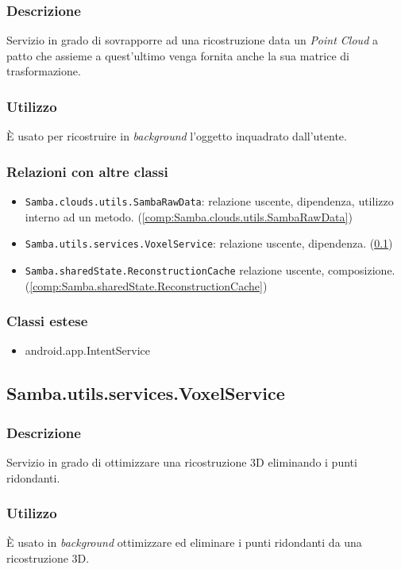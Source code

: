 \subsubsection{Descrizione}
Servizio in grado di sovrapporre ad una ricostruzione data un \emph{Point Cloud} a patto che assieme a quest'ultimo venga fornita anche la sua matrice di trasformazione.
\subsubsection{Utilizzo}
È usato per ricostruire in \emph{background} l'oggetto inquadrato dall'utente.
\subsubsection{Relazioni con altre classi}
\begin{itemize}
	\item \texttt{Samba.clouds.utils.SambaRawData}: relazione uscente, dipendenza, utilizzo interno ad un metodo. (\ref{comp:Samba.clouds.utils.SambaRawData})
	\item \texttt{Samba.utils.services.VoxelService}: relazione uscente, dipendenza. (\ref{comp:Samba.utils.services.VoxelService})
	\item \texttt{Samba.sharedState.ReconstructionCache} relazione uscente, composizione. (\ref{comp:Samba.sharedState.ReconstructionCache})
\end{itemize}
\subsubsection{Classi estese}
\begin{itemize}
	\item android.app.IntentService
\end{itemize}

\subsection{Samba.utils.services.VoxelService}\label{comp:Samba.utils.services.VoxelService}
\subsubsection{Descrizione}
Servizio in grado di ottimizzare una ricostruzione 3D eliminando i punti ridondanti.
\subsubsection{Utilizzo}
È usato in \emph{background} ottimizzare ed eliminare i punti ridondanti da una ricostruzione 3D.

